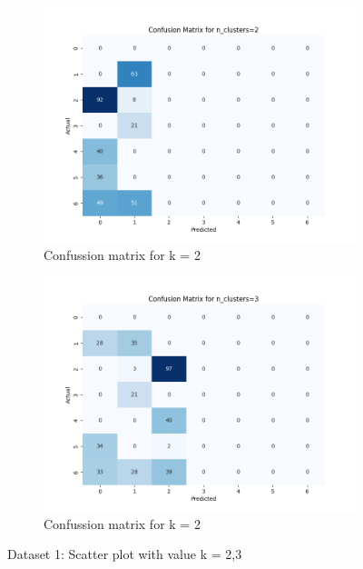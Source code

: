 \documentclass[12pt]{report}
\begin{document}
	\begin{figure}[H]
		\centering
		\begin{subfigure}{.5\textwidth}
			\centering
			\includegraphics[width=.9\linewidth]{../K-means/Output/Dataset1/confusionMatrix_k=2.png}
			\caption{Confussion matrix for k = 2}
			\label{Dataset1ConfusionMatrixk2}
		\end{subfigure}%
		\begin{subfigure}{.5\textwidth}
			\centering
			\includegraphics[width=.9\linewidth]{../K-means/Output/Dataset1/confusionMatrix_k=3.png}
			\caption{Confussion matrix for k = 2}
			\label{Dataset1ConfusionMatrixk3}
		\end{subfigure}
		\caption{Dataset 1: Scatter plot with value k = 2,3}
		\label{Dataset1ConfussionMatrix23}
	\end{figure}
\end{document}

